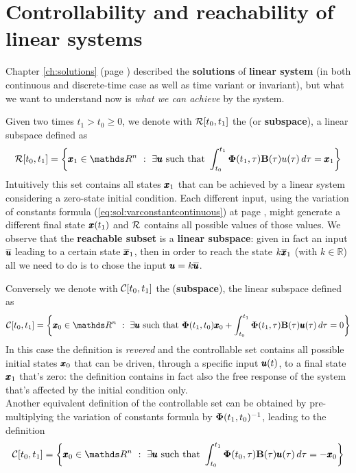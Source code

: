 \chapter{Controllability and reachability of linear systems} \label{ch:controllability}
	Chapter \ref{ch:solutions} (page \pageref{ch:solutions}) described the \textbf{solutions} of \textbf{linear system} (in both continuous and discrete-time case as well as time variant or invariant), but what we want to understand now is \textit{what we can achieve} by the system.
	
	Given two times $t_1 > t_0 \geq 0$, we denote with $\mathcal R[t_0,t_1]$ the  (or \textbf{subspace}), a linear subspace defined as
	\begin{equation}
		\reach[t_0,t_1] = \left\{ \x_1 \in \mathds R^n \ : \ \exists \u \textrm{ such that } \int_{t_0}^{t_1} \stm(t_1,\tau) \B(\tau) u(\tau)\, d\tau = \x_1 \right\}
	\end{equation}
	Intuitively this set contains all states $\pmb{x}_1$ that can be achieved by a linear system considering a zero-state initial condition. Each different input, using the variation of constants formula (\ref{eq:sol:varconstantcontinuous}) at page \pageref{eq:sol:varconstantcontinuous}, might generate a  different final state $\pmb{x}(t_1)$ and $\mathcal R$ contains all possible values of those values. We observe that the \textbf{reachable subset} is a \textbf{linear subspace}: given in fact an input $\overline {\pmb{u}}$ leading to a certain state $\overline {\pmb{x}}_1$, then in order to reach the state $k \overline {\pmb{x}}_1$ (with $k \in \mathds R$) all we need to do is to chose the input $\pmb{u} = k \overline {\pmb{u}}$.
	
	Conversely we denote with $\mathcal C[t_0,t_1]$ the  (\textbf{subspace}), the linear subspace defined as
	\begin{equation}
		\ctr[t_0,t_1] = \left\{ \x_0 \in \mathds R^n \ : \ \exists \u \textrm{ such that } \stm(t_1,t_0)\x_0 + \int_{t_0}^{t_1} \stm(t_1,\tau) \B(\tau) \u(\tau)\, d\tau = 0 \right\}
	\end{equation}
	In this case the definition is \textit{revered} and the controllable set contains all possible initial states $\pmb{x}_0$ that can be driven, through a specific input $\pmb{u}(t)$, to a final state $\pmb{x}_1$ that's zero: the definition contains in fact also the free response of the system that's affected by the initial condition only.\\
	Another equivalent definition of the controllable set can be obtained by pre-multiplying the variation of constants formula by $\mathbf{\Phi}(t_1,t_0)^{-1}$, leading to the definition
	\[ \ctr[t_0,t_1] = \left\{ \x_0 \in \mathds R^n \ : \ \exists \u \textrm{ such that } \int_{t_0}^{t_1} \stm(t_0,\tau) \B(\tau) \u(\tau)\, d\tau = -\x_0 \right\} \]
	
